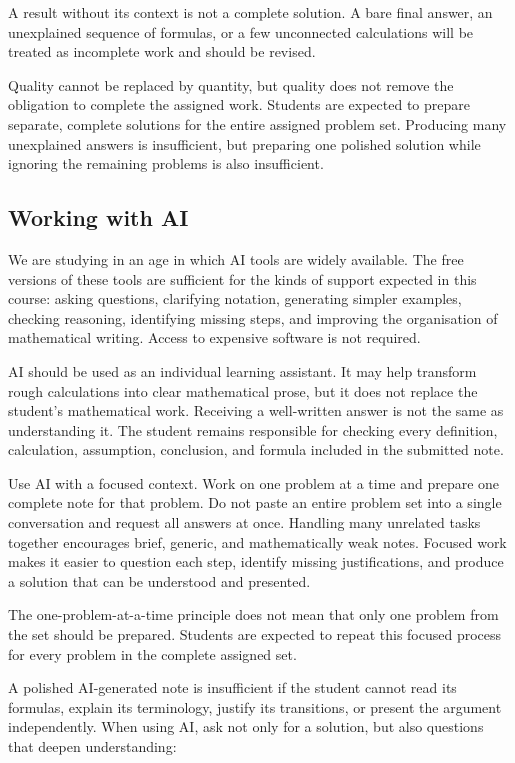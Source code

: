 A result without its context is not a complete solution. A bare final answer,
an unexplained sequence of formulas, or a few unconnected calculations will be
treated as incomplete work and should be revised.

Quality cannot be replaced by quantity, but quality does not remove the
obligation to complete the assigned work. Students are expected to prepare
separate, complete solutions for the entire assigned problem set. Producing
many unexplained answers is insufficient, but preparing one polished solution
while ignoring the remaining problems is also insufficient.

\subsection{Working with AI}

We are studying in an age in which AI tools are widely available. The free
versions of these tools are sufficient for the kinds of support expected in
this course: asking questions, clarifying notation, generating simpler
examples, checking reasoning, identifying missing steps, and improving the
organisation of mathematical writing. Access to expensive software is not
required.

AI should be used as an individual learning assistant. It may help transform
rough calculations into clear mathematical prose, but it does not replace the
student's mathematical work. Receiving a well-written answer is not the same as
understanding it. The student remains responsible for checking every
definition, calculation, assumption, conclusion, and formula included in the
submitted note.

Use AI with a focused context. Work on one problem at a time and prepare one
complete note for that problem. Do not paste an entire problem set into a
single conversation and request all answers at once. Handling many unrelated
tasks together encourages brief, generic, and mathematically weak notes.
Focused work makes it easier to question each step, identify missing
justifications, and produce a solution that can be understood and presented.

The one-problem-at-a-time principle does not mean that only one problem from the
set should be prepared. Students are expected to repeat this focused process
for every problem in the complete assigned set.

A polished AI-generated note is insufficient if the student cannot read its
formulas, explain its terminology, justify its transitions, or present the
argument independently. When using AI, ask not only for a solution, but also
questions that deepen understanding:

